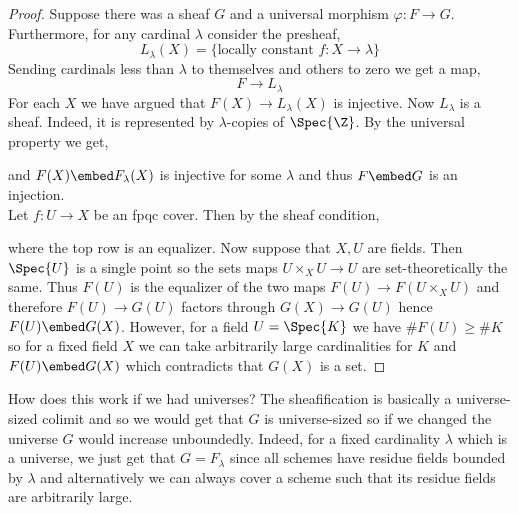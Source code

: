 \documentclass[12pt]{article}
\begin{document}
\begin{proof}
Suppose there was a sheaf $G$ and a universal morphism $\varphi : F \to G$. Furthermore, for any cardinal $\lambda$ consider the presheaf,
\[ L_\lambda(X) = \{ \text{locally constant } f : X \to \lambda \} \]
Sending cardinals less than $\lambda$ to themselves and others to zero we get a map,
\[ F \to L_\lambda \]
For each $X$ we have argued that $F(X) \to L_\lambda(X)$ is injective. Now $L_\lambda$ is a sheaf. Indeed, it is represented by $\lambda$-copies of $\Spec{\Z}$. By the universal property we get,
\begin{center}
\end{center}
and $F(X) \embed F_\lambda(X)$ is injective for some $\lambda$ and thus $F \embed G$ is an injection. 
\bigskip\\
Let $f : U \to X$ be an fpqc cover. Then by the sheaf condition,
\begin{center}
\end{center}
where the top row is an equalizer. Now suppose that $X, U$ are fields. Then $\Spec{U}$ is a single point so the sets maps $U \times_X U \to U$ are set-theoretically the same. Thus $F(U)$ is the equalizer of the two maps $F(U) \to F(U \times_X U)$ and therefore $F(U) \to G(U)$ factors through $G(X) \to G(U)$ hence $F(U) \embed G(X)$. However, for a field $U = \Spec{K}$ we have $\# F(U) \ge \# K$ so for a fixed field $X$ we can take arbitrarily large cardinalities for $K$ and $F(U) \embed G(X)$ which contradicts that $G(X)$ is a set. 
\end{proof}

\begin{rmk}
How does this work if we had universes? The sheafification is basically a universe-sized colimit and so we would get that $G$ is universe-sized so if we changed the universe $G$ would increase unboundedly. Indeed, for a fixed cardinality $\lambda$ which is a universe, we just get that $G = F_\lambda$ since all schemes have residue fields bounded by $\lambda$ and alternatively we can always cover a scheme such that its residue fields are arbitrarily large. 
\end{rmk}
\end{document}
